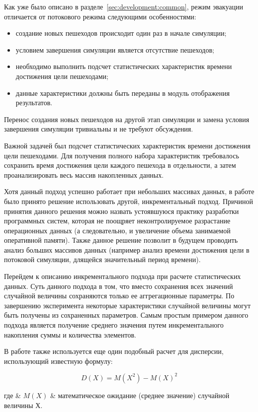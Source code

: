 Как уже было описано в разделе~\ref{sec:development:common}, режим эвакуации отличается от потокового режима следующими особенностями:

\begin{itemize}
  \item создание новых пешеходов происходит один раз в начале симуляции;
  \item условием завершения симуляции является отсутствие пешеходов;
  \item необходимо выполнить подсчет статистических характеристик времени достижения цели пешеходами;
  \item данные характеристики должны быть переданы в модуль отображения результатов.
\end{itemize}

Перенос создания новых пешеходов на другой этап симуляции и замена условия завершения симуляции
тривиальны и не требуют обсуждения.

Важной задачей был подсчет статистических характеристик времени достижения цели пешеходами.
Для получения полного набора характеристик требовалось сохранить время достижения цели каждого пешехода в отдельности,
а затем проанализировать весь массив накопленных данных.

Хотя данный подход успешно работает при небольших массивах данных, в работе было принято решение использовать другой, инкрементальный подход.
Причиной принятия данного решения можно назвать устоявшуюся практику разработки программных систем, которая не поощряет
неконтролируемое разрастание операционных данных (а следовательно, и увеличение объема занимаемой оперативной памяти).
Также данное решение позволит в будущем проводить анализ больших массивов данных
(например анализ времени достижения цели в потоковой симуляции, длящейся значительный период времени).

Перейдем к описанию инкрементального подхода при расчете статистических данных.
Суть данного подхода в том, что вместо сохранения всех значений случайной величины сохраняются только ее аггрегационные параметры.
По завершению эксперимента некоторые характеристики случайной величины могут быть получены из сохраненных параметров.
Самым простым примером данного подхода является получение среднего значения путем инкрементального накопления суммы и количества элементов.

В работе также используется еще один подобный расчет для дисперсии, использующий известную формулу:

\begin{equation}
  \label{sec:development:core:escape:d_fm}
  D(X) = M(X^2) - M(X)^2
\end{equation}
\begin{explanation}
где & $ M(X) $ & математическое ожидание (среднее значение) случайной величины Х. \\
\end{explanation}

